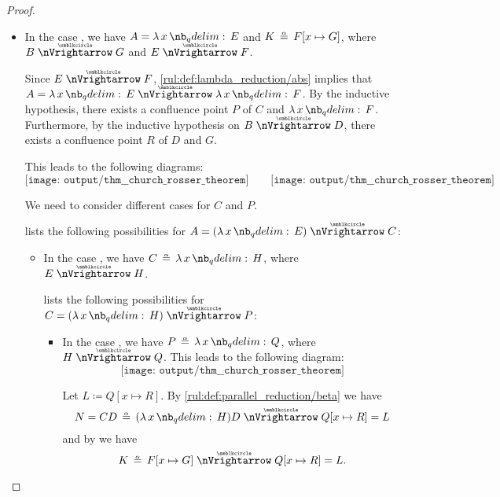 \begin{proof}
\begin{itemize}
\begin{itemize}
      \item In the case , we have \( A = \qabs x E \) and \( K \aequiv F[x \mapsto G] \), where \( B \ppred G \) and \( E \ppred F \).

      Since \( E \ppred F \), \ref{rul:def:lambda_reduction/abs} implies that \( A = \qabs x E \ppred \qabs x F \). By the inductive hypothesis, there exists a confluence point \( P \) of \( C \) and \( \qabs x F \). Furthermore, by the inductive hypothesis on \( B \ppred D \), there exists a confluence point \( R \) of \( D \) and \( G \).

      This leads to the following diagrams:
      \begin{equation*}
        \texttt{[image: output/thm\_\_church\_rosser\_theorem]}
        \quad\quad
        \texttt{[image: output/thm\_\_church\_rosser\_theorem]}
      \end{equation*}

      We need to consider different cases for \( C \) and \( P \).

       lists the following possibilities for \( A = (\qabs x E) \ppred C \):
      \begin{itemize}
        \item In the case , we have \( C \aequiv \qabs x H \), where \( E \ppred H \).

         lists the following possibilities for \( C = (\qabs x H) \ppred P \):
        \begin{itemize}
          \item In the case , we have \( P \aequiv \qabs x Q \), where \( H \ppred Q \). This leads to the following diagram:
          \begin{equation*}
            \texttt{[image: output/thm\_\_church\_rosser\_theorem]}
          \end{equation*}

          Let \( L \coloneqq Q[x \mapsto R] \). By \ref{rul:def:parallel_reduction/beta} we have
          \begin{equation*}
            N = CD \aequiv (\qabs x H) D \ppred Q[x \mapsto R] = L
          \end{equation*}
          and by  we have
          \begin{equation*}
            K \aequiv F[x \mapsto G] \ppred Q[x \mapsto R] = L.
          \end{equation*}


\end{itemize}
\end{itemize}
\end{itemize}
\end{itemize}
\end{proof}
